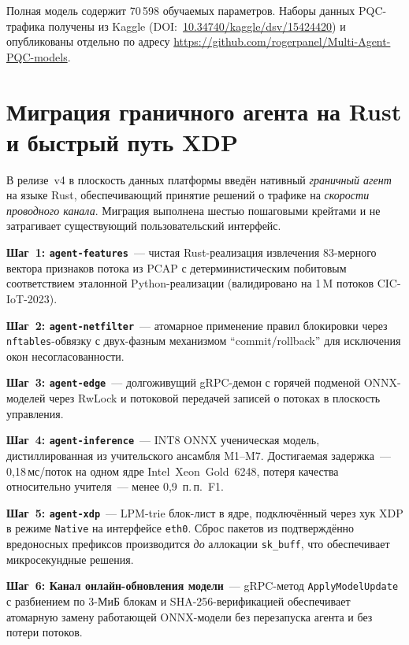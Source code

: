 Полная модель содержит 70\,598 обучаемых параметров. Наборы данных PQC-трафика получены из Kaggle (DOI:~\url{10.34740/kaggle/dsv/15424420}) и опубликованы отдельно по адресу \url{https://github.com/rogerpanel/Multi-Agent-PQC-models}.


\section{Миграция граничного агента на Rust и быстрый путь XDP}
\label{sec:rust_edge_agent}

В релизе~v4 в плоскость данных платформы введён нативный
\emph{граничный агент} на языке Rust, обеспечивающий принятие решений
о трафике на \emph{скорости проводного канала}. Миграция выполнена
шестью пошаговыми крейтами и не затрагивает существующий
пользовательский интерфейс.

\noindent\textbf{Шаг~1: \texttt{agent-features}}~--- чистая
Rust-реализация извлечения 83-мерного вектора признаков потока
из PCAP с детерминистическим побитовым соответствием
эталонной Python-реализации (валидировано на 1\,M потоков
CIC-IoT-2023).

\noindent\textbf{Шаг~2: \texttt{agent-netfilter}}~--- атомарное
применение правил блокировки через \texttt{nftables}-обвязку с
двух-фазным механизмом ``commit/rollback'' для исключения окон
несогласованности.

\noindent\textbf{Шаг~3: \texttt{agent-edge}}~--- долгоживущий
gRPC-демон с горячей подменой ONNX-моделей через RwLock и потоковой
передачей записей о потоках в плоскость управления.

\noindent\textbf{Шаг~4: \texttt{agent-inference}}~--- INT8 ONNX
ученическая модель, дистиллированная из учительского ансамбля
\textsf{M1}--\textsf{M7}. Достигаемая задержка~--- 0{,}18\,мс/поток
на одном ядре Intel~Xeon~Gold~6248, потеря качества относительно
учителя~--- менее 0{,}9~п.\,п.~F1.

\noindent\textbf{Шаг~5: \texttt{agent-xdp}}~--- LPM-trie блок-лист в
ядре, подключённый через хук XDP в режиме \texttt{Native} на
интерфейсе \texttt{eth0}. Сброс пакетов из подтверждённо
вредоносных префиксов производится \emph{до} аллокации
\texttt{sk\_buff}, что обеспечивает микросекундные решения.

\noindent\textbf{Шаг~6: Канал онлайн-обновления модели}~---
gRPC-метод \texttt{ApplyModelUpdate} с разбиением по 3-МиБ блокам и
SHA-256-верификацией обеспечивает атомарную замену работающей
ONNX-модели без перезапуска агента и без потери потоков.

